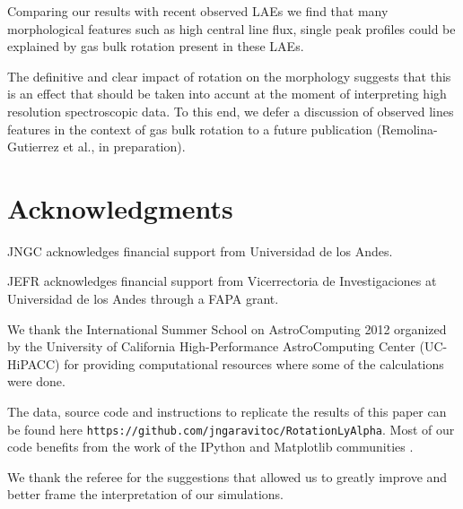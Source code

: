 \documentclass{emulateapj}
\newcommand{\ly}{{\ifmmode{{\rm Ly}\alpha~}\else{Ly$\alpha$~}\fi}}
\begin{document}
Comparing our results with recent observed LAEs we find that many 
morphological features such as high central line flux, single peak
profiles  could be explained by gas bulk  rotation present in these
LAEs. 

The definitive and clear impact of rotation on the \ly morphology
suggests that this is an effect that should be taken into accunt at
the moment of interpreting high resolution spectroscopic data. To this
end, we defer a discussion of observed lines features in the context of gas
bulk rotation to a future publication (Remolina-Gutierrez et al., in
preparation).   

\section*{Acknowledgments}

JNGC acknowledges financial support from Universidad de los
Andes. 

JEFR acknowledges financial support from Vicerrectoria de
Investigaciones at Universidad de los Andes through a FAPA grant.

We thank the International Summer School on AstroComputing
2012 organized by the University of California High-Performance
AstroComputing Center (UC-HiPACC) for providing computational
resources where some of the calculations were done. 

The data, source code and instructions to
replicate the results of this paper can be found
here {\texttt{https://github.com/jngaravitoc/RotationLyAlpha}}.
Most of our code benefits from the work of the IPython and Matplotlib
communities \citep{IPython,matplotlib}.

We thank the referee for the suggestions that allowed us to greatly
improve and better frame the interpretation of our simulations. 



 
\end{document}
